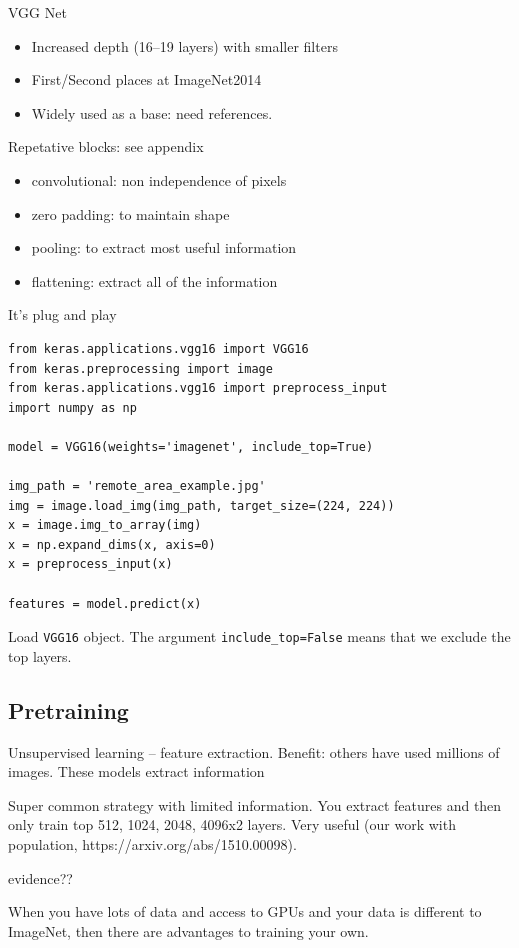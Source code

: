 \documentclass[12pt, a4paper, oneside, headinclude, footinclude]{article}
\begin{document}
VGG Net~\cite{SimonyanZ14a}
\begin{itemize}
    \item Increased depth (16--19 layers) with smaller filters
    \item First/Second places at ImageNet2014
    \item Widely used as a base: need references.
\end{itemize}

Repetative blocks: see appendix
\begin{itemize}
    \item convolutional: non independence of pixels
    \item zero padding: to maintain shape
    \item pooling: to extract most useful information
    \item flattening: extract all of the information
\end{itemize}

It's plug and play

\begin{verbatim}
from keras.applications.vgg16 import VGG16
from keras.preprocessing import image
from keras.applications.vgg16 import preprocess_input
import numpy as np

model = VGG16(weights='imagenet', include_top=True)

img_path = 'remote_area_example.jpg'
img = image.load_img(img_path, target_size=(224, 224))
x = image.img_to_array(img)
x = np.expand_dims(x, axis=0)
x = preprocess_input(x)

features = model.predict(x)
\end{verbatim}

Load \texttt{VGG16} object. The argument \texttt{include\_top=False} means that we exclude
the top layers. 

\subsection{Pretraining}

Unsupervised learning -- feature extraction. Benefit: others have used
millions of images. These models extract information

Super common strategy with limited information. You extract features and then
only train top 512, 1024, 2048, 4096x2 layers. Very useful (our work with
population, https://arxiv.org/abs/1510.00098).

evidence??

When you have lots of data and access to GPUs and your data is different to
ImageNet, then there are advantages to training your own.
\end{document}
